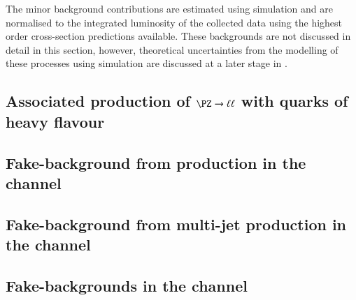 The minor background contributions are estimated using simulation and
are normalised to the integrated luminosity of the collected data
using the highest order cross-section predictions available. These
backgrounds are not discussed in detail in this section, however,
theoretical uncertainties from the modelling of these processes using
simulation are discussed at a later stage in
.




\subsection{Associated production of $\PZ \to \ell\ell$ with quarks of heavy flavour}%
\label{sec:bkg_zjets}


\subsection{Fake-\tauhadvis background from \ttbar production in the \hadhad channel}%
\label{sec:bkg_hadhad_ttbarfakes}


\subsection{Fake-\tauhadvis background from multi-jet production in the \hadhad channel}%
\label{sec:bkg_hadhad_ff}


\subsection{Fake-\tauhadvis backgrounds in the \lephad channel}%
\label{sec:bkg_lephad_combined_ff}



